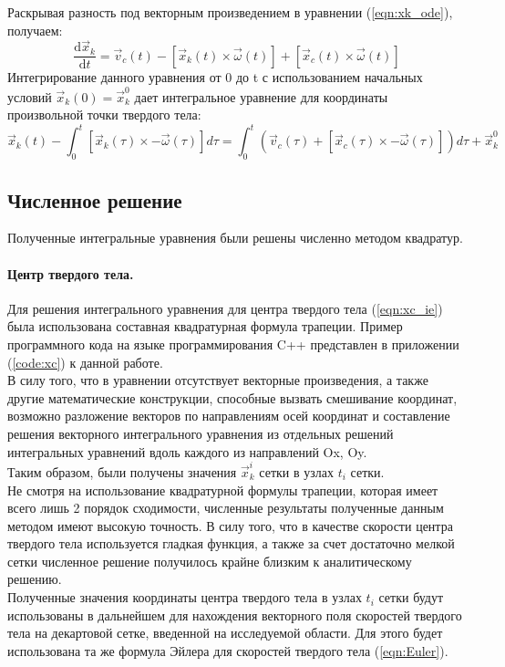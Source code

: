\documentclass[12pt,a4paper]{article}
\begin{document}
Раскрывая разность под векторным произведением в уравнении (\ref{eqn:xk_ode}), получаем:
\[
\frac{\text{d}\overrightarrow{x}_k}{\text{d}t}=\overrightarrow{v}_c(t)-[\overrightarrow{x}_k(t)\times\overrightarrow{\omega}(t)]+[\overrightarrow{x}_c(t)\times\overrightarrow{\omega}(t)]
\] 
Интегрирование данного уравнения от 0 до t с использованием начальных условий $\overrightarrow{x}_k(0) = \overrightarrow{x}_k^0$ дает интегральное уравнение для координаты произвольной точки твердого тела:
\begin{equation}
\label{eqn:xk_ie}
\overrightarrow{x}_k(t)-\int_{0}^{t} [\overrightarrow{x}_k(\tau)\times-\overrightarrow{\omega}(\tau)] d\tau
= 
\int_{0}^{t}(\overrightarrow{v}_c(\tau)+[\overrightarrow{x}_c(\tau)\times-\overrightarrow{\omega}(\tau)])d\tau+\overrightarrow{x}_k^0
\end{equation}

\subsection{Численное решение}
Полученные интегральные уравнения были решены численно методом квадратур.
\paragraph{Центр твердого тела.}
Для решения интегрального уравнения для центра твердого тела (\ref{eqn:xc_ie}) была использована составная квадратурная формула трапеции. Пример программного кода на языке программирования C++ представлен в приложении (\ref{code:xc}) к данной работе.\\
В силу того, что в уравнении отсутствует векторные произведения, а также другие математические конструкции, способные вызвать смешивание координат, возможно разложение векторов по направлениям осей координат и составление решения векторного интегрального уравнения из отдельных решений интегральных уравнений вдоль каждого из направлений Ox, Oy.\\
Таким образом, были получены значения $\overrightarrow{x}_k^i$ сетки в узлах $t_i$ сетки.\\
Не смотря на использование квадратурной формулы трапеции, которая имеет всего лишь 2 порядок сходимости, численные результаты полученные данным методом имеют высокую точность. В силу того, что в качестве скорости центра твердого тела используется гладкая функция, а также за счет достаточно мелкой сетки численное решение получилось крайне близким к аналитическому решению.\\
Полученные значения координаты центра твердого тела в узлах $t_i$ сетки будут использованы в дальнейшем для нахождения векторного поля скоростей твердого тела на декартовой сетке, введенной на исследуемой области. Для этого будет использована та же формула Эйлера для скоростей твердого тела (\ref{eqn:Euler}).
\end{document}

